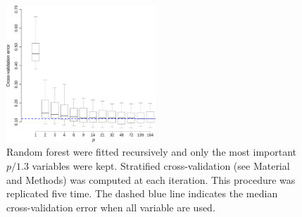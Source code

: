 \begin{figure}[h!]
  \centering    
    \includegraphics[width=0.5\textwidth]{figures/variable_elimination.pdf}
  \caption{
  Random forest were fitted recursively and only the most important $p/1.3$ variables were kept.
  Stratified cross-validation (see Material and Methods) was computed at each iteration. This procedure was replicated five time.
  The dashed blue line indicates the median cross-validation error when all variable are used.
  \label{fig:variable_elimination}
  }
\end{figure}
